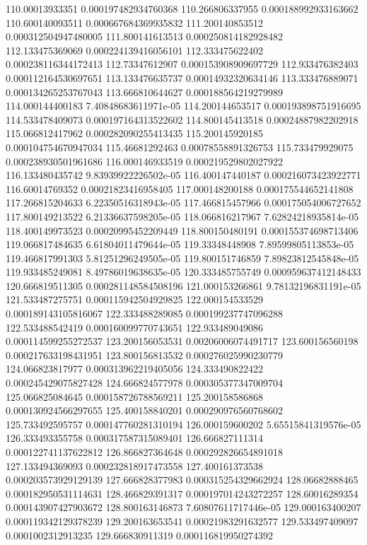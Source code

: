 {110.00013933351 0.000197482934760368
110.266806337955 0.000188992933163662
110.600140093511 0.000667684369935832
111.200140853512 0.000312504947480005
111.800141613513 0.000250814182928482
112.133475369069 0.000224139416056101
112.333475622402 0.000238116344172413
112.73347612907 0.000153908909697729
112.933476382403 0.000112164530697651
113.133476635737 0.00014932320634146
113.333476889071 0.000134265253767043
113.666810644627 0.000188564219279989
114.000144400183 7.40848683611971e-05
114.200144653517 0.000193898751916695
114.533478409073 0.000197164313522602
114.800145413518 0.00024887982202918
115.066812417962 0.000282090255413435
115.200145920185 0.000104754670947034
115.46681292463 0.00078558891326753
115.733479929075 0.000238930501961686
116.000146933519 0.000219529802027922
116.133480435742 9.83939922226502e-05
116.400147440187 0.000216073423922771
116.60014769352 0.00021823416958405
117.000148200188 0.000175544652141808
117.266815204633 6.22350516318943e-05
117.466815457966 0.000175054006727652
117.800149213522 6.21336637598205e-05
118.066816217967 7.62824218935814e-05
118.400149973523 0.00020995452209449
118.800150480191 0.000155374698713406
119.066817484635 6.61804011479644e-05
119.33348448908 7.89599805113853e-05
119.466817991303 5.81251296249505e-05
119.800151746859 7.89823812545848e-05
119.933485249081 8.49786019638635e-05
120.333485755749 0.000959637412148433
120.666819511305 0.000281148584508196
121.000153266861 9.78132196831191e-05
121.533487275751 0.000115942504929825
122.000154533529 0.000189143105816067
122.333488289085 0.000199237747096288
122.533488542419 0.000160099770743651
122.933489049086 0.000114599255272537
123.200156053531 0.00206006074491717
123.600156560198 0.000217633198431951
123.800156813532 0.000276025990230779
124.066823817977 0.000313962219405056
124.333490822422 0.000245429075827428
124.666824577978 0.000305377347009704
125.066825084645 0.000158726788569211
125.200158586868 0.000130924566297655
125.400158840201 0.000290976560768602
125.733492595757 0.000147760281310194
126.000159600202 5.65515841319576e-05
126.333493355758 0.000317587315089401
126.666827111314 0.000122741137622812
126.866827364648 0.000292826654891018
127.133494369093 0.000232818917473558
127.400161373538 0.000203573929129139
127.666828377983 0.000315254329662924
128.06682888465 0.000182950531114631
128.466829391317 0.000197014243272257
128.60016289354 0.000143907427903672
128.800163146873 7.60807611717446e-05
129.000163400207 0.000119342129378239
129.200163653541 0.00021983291632577
129.533497409097 0.0001002312913235
129.666830911319 0.000116819950274392
}
